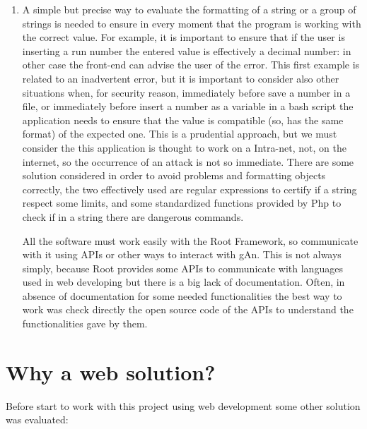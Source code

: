 \begin{enumerate}
\item
A simple but precise way to evaluate the formatting of a string or a group of strings is needed to ensure in every moment that the program is working with the correct value. For example, it is important to ensure that if the user is inserting a run number the entered value is effectively a decimal number: in other case the front-end can advise the user of the error. This first example is related to an inadvertent error, but it is important to consider also other situations when, for security reason, immediately before save a number in a file, or immediately before insert a number as a variable in a bash script the application needs to ensure that the value is compatible (so, has the same format) of the expected one. This is a prudential approach, but we must consider the this application is thought to work on a Intra-net, not, on the internet, so the occurrence of an attack is not so immediate. There are some solution considered in order to avoid problems and formatting objects correctly, the two effectively used are regular expressions to certify if a string respect some limits, and some standardized functions provided by Php to check if in a string there are dangerous commands.
 
All the software must work easily with the Root Framework, so communicate with it using APIs or other ways to interact with gAn. This is not always simply, because Root provides some APIs to communicate with languages used in web developing but there is a big lack of documentation. Often, in absence of documentation for some needed functionalities the best way to work was check directly the open source code of the APIs to understand the functionalities gave by them.

\end{enumerate}

\section{Why a web solution?}

Before start to work with this project using web development some other solution was evaluated:

